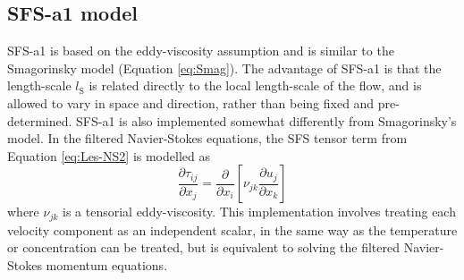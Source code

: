 \subsection{SFS-a1 model}
SFS-a1 is based on the eddy-viscosity assumption and is similar to
the Smagorinsky model (Equation \ref{eq:Smag}). The advantage of
SFS-a1 is that the length-scale $l_{\textrm{S}}$ is related
directly to the local length-scale of the flow, and is allowed to
vary in space and direction, rather than being fixed and
pre-determined. SFS-a1 is also implemented somewhat differently
from Smagorinsky's model. In the filtered Navier-Stokes equations,
the SFS tensor term from Equation \ref{eq:Les-NS2} is modelled as
\begin{equation}
\frac{\partial \tau_{ij}}{\partial x_j} = \frac{\partial}{\partial
x_i} \left[\nu_{jk} \frac{\partial u_j}{\partial x_k}\right]
\label{eq:Tlike}
\end{equation}
where $\nu_{jk}$ is a tensorial eddy-viscosity. This
implementation involves treating each velocity component as an
independent scalar, in the same way as the temperature or
concentration can be treated, but is equivalent to solving the
filtered Navier-Stokes momentum equations.

